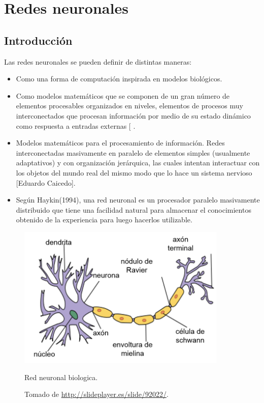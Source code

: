 \section{Redes neuronales}

\subsection{Introducci\'on}

Las redes neuronales se pueden definir  de distintas maneras:
\begin{itemize}
\item Como una forma de computación inspirada en modelos biológicos.
\item Como modelos matemáticos que se componen de un gran número de elementos procesables organizados en niveles, elementos de procesos muy interconectados que procesan información por medio de su estado dinámico como respuesta a entradas externas [  .
\item Modelos matemáticos para el procesamiento de información.
Redes interconectadas masivamente en paralelo de elementos simples (usualmente adaptativos) y con organización jerárquica, las cuales intentan interactuar con los objetos del mundo real del mismo modo que lo hace un sistema nervioso [Eduardo Caicedo].
\item Según Haykin(1994), una red neuronal es un procesador paralelo masivamente distribuido que tiene una facilidad natural para almacenar el conocimientos obtenido de la experiencia para luego hacerlos utilizable. 
\end{itemize}

\begin{figure}[H]
	\centering
	\includegraphics[width=10cm]{Capitulo2MarcoTeorico/Imagenes/red.png}	
	\caption{Red neuronal biologica.}
	\caption*{Tomado de \url{http://slideplayer.es/slide/92022/}.}
	\label{fig:redbiologica}	
\end{figure}
